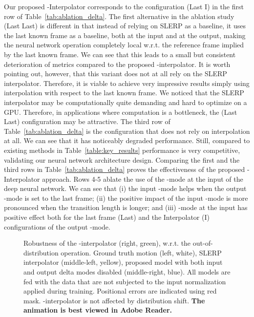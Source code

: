 \documentclass[letterpaper]{article} \usepackage[]{aaai23}  \usepackage{times}  \usepackage{helvet}  \usepackage{courier}  \usepackage[hyphens]{url}  \usepackage{graphicx} \urlstyle{rm} \def\UrlFont{\rm}  \usepackage{natbib}  \usepackage{caption} \frenchspacing  \setlength{\pdfpagewidth}{8.5in} \setlength{\pdfpageheight}{11in}
\begin{document}
Our proposed -Interpolator corresponds to the configuration (Last I) in the first row of Table~\ref{tab:ablation_delta}. The first alternative in the ablation study (Last Last) is different in that instead of relying on SLERP as a baseline, it uses the last known frame as a baseline, both at the input and at the output, making the neural network operation completely local w.r.t. the reference frame implied by the last known frame. We can see that this leads to a small but consistent deterioration of metrics compared to the proposed -interpolator. It is worth pointing out, however, that this variant does not at all rely on the SLERP interpolator. Therefore, it is viable to achieve very impressive results simply using  interpolation with respect to the last known frame. We noticed that the SLERP interpolator may be computationally quite demanding and hard to optimize on a GPU. Therefore, in applications where computation is a bottleneck, the (Last Last) configuration may be attractive. The third row of Table~\ref{tab:ablation_delta} is the configuration that does not rely on  interpolation at all. We can see that it has noticeably degraded performance. Still, compared to existing methods in Table~\ref{table:key_results} performance is very competitive, validating our neural network architecture design. Comparing the first and the third rows in Table~\ref{tab:ablation_delta} proves the effectiveness of the proposed -Interpolator approach. Rows 4-5 ablate the use of the -mode at the input of the deep neural network. We can see that (i) the input -mode helps when the output -mode is set to the last frame; (ii) the positive impact of the input -mode is more pronounced when the transition length is longer; and (iii) -mode at the input has positive effect both for the last frame (Last) and the Interpolator (I) configurations of the output -mode.

\begin{figure}[!t]
    \centering
    \caption{Robustness of the -interpolator (right, green), w.r.t. the out-of-distribution operation. Ground truth motion (left, white), SLERP interpolator (middle-left, yellow), proposed model with both input and output delta modes disabled (middle-right, blue). All models are fed with the data that are not subjected to the input normalization applied during training. Positional errors are indicated using red mask. -interpolator is not affected by distribution shift. \textbf{The animation is best viewed in Adobe Reader.}}
    \label{fig:delta-Interpolator_robustness}
    \vspace{-2em}
\end{figure}
\end{document}
